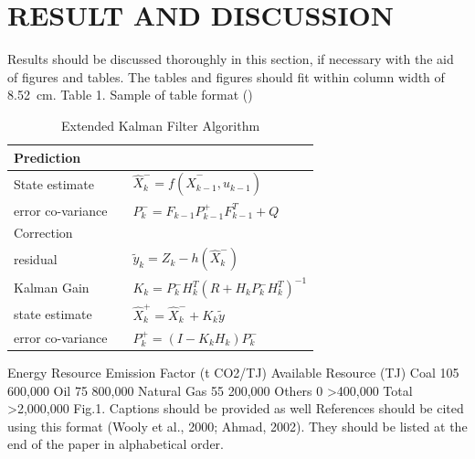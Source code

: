 \documentclass[10pt,letterpaper,twocolumn]{article}
\begin{document}








\section{RESULT AND DISCUSSION}
Results should be discussed thoroughly in this section, if necessary with the aid of figures and tables. The tables and figures should fit within column width of 8.52 cm.
Table 1. Sample of table format (\cite{al2015multiple})

\begin{table}
	\begin{center}
		\caption{Extended Kalman Filter Algorithm}
		\label{Table: Extended Kalman Filter Algorithm}
		\begin{tabular}{lll}
			\hline
			Prediction&&  \\
			\hline
			State estimate&& \(\hat{X}^-_k = f(\hat{X}^-_{k-1},u_{k-1})\) \\
			error co-variance&& \(P^-_k = F_{k-1}P^+_{k-1}F^T_{k-1} + Q\)\\
			\hline
			Correction&&  \\
			\hline
			residual&& \(\tilde{y}_k = Z_k - h(\hat{X}^-_k)\)\\
			Kalman Gain&& \(K_k = P^-_kH^T_k(R+H_kP^-_kH^T_k)^{-1}\)\\
			state estimate&& \(\hat{X}^+_k = \hat{X}^-_k + K_k\tilde{y}\)\\
			error co-variance&& \(P^+_k = (I-K_kH_k)P^-_k\)\\
			\hline 
		\end{tabular}
	\end{center}
\end{table}

Energy Resource Emission Factor
(t CO2/TJ) Available Resource (TJ)  Coal 105 600,000  Oil 75 800,000  Natural Gas  55 200,000  Others 0 >400,000  Total  >2,000,000  
Fig.1. Captions should be provided as well
References should be cited using this format (Wooly et al., 2000; Ahmad, 2002). They should be listed at the end of the paper in alphabetical order.
\end{document}
